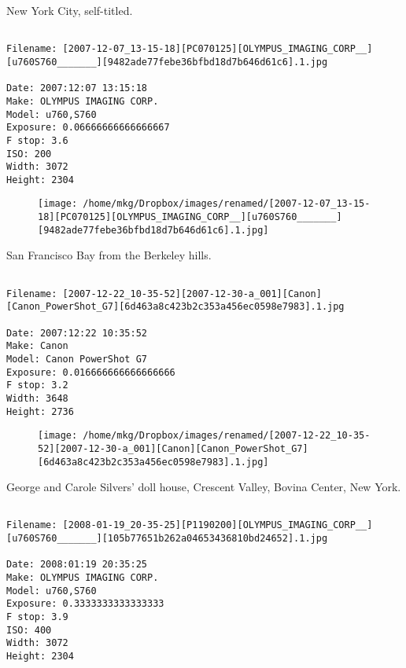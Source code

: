 \clearpage
\onecolumn
\noindent New York City, self-titled.
\noindent
\begin{lstlisting}

Filename: [2007-12-07_13-15-18][PC070125][OLYMPUS_IMAGING_CORP__][u760S760_______][9482ade77febe36bfbd18d7b646d61c6].1.jpg

Date: 2007:12:07 13:15:18
Make: OLYMPUS IMAGING CORP.  
Model: u760,S760       
Exposure: 0.06666666666666667
F stop: 3.6
ISO: 200
Width: 3072
Height: 2304
\end{lstlisting}
\clearpage

\begin{figure}
\texttt{[image: /home/mkg/Dropbox/images/renamed/[2007-12-07\_13-15-18][PC070125][OLYMPUS\_IMAGING\_CORP\_\_][u760S760\_\_\_\_\_\_\_][9482ade77febe36bfbd18d7b646d61c6].1.jpg]}
\end{figure}
    
\clearpage
\onecolumn
\noindent San Francisco Bay from the Berkeley hills.
\noindent
\begin{lstlisting}

Filename: [2007-12-22_10-35-52][2007-12-30-a_001][Canon][Canon_PowerShot_G7][6d463a8c423b2c353a456ec0598e7983].1.jpg

Date: 2007:12:22 10:35:52
Make: Canon
Model: Canon PowerShot G7
Exposure: 0.016666666666666666
F stop: 3.2
Width: 3648
Height: 2736
\end{lstlisting}
\clearpage

\begin{figure}
\texttt{[image: /home/mkg/Dropbox/images/renamed/[2007-12-22\_10-35-52][2007-12-30-a\_001][Canon][Canon\_PowerShot\_G7][6d463a8c423b2c353a456ec0598e7983].1.jpg]}
\end{figure}
    
\clearpage
\onecolumn
\noindent George and Carole Silvers' doll house, Crescent Valley, Bovina Center, New York.
\noindent
\begin{lstlisting}

Filename: [2008-01-19_20-35-25][P1190200][OLYMPUS_IMAGING_CORP__][u760S760_______][105b77651b262a04653436810bd24652].1.jpg

Date: 2008:01:19 20:35:25
Make: OLYMPUS IMAGING CORP.  
Model: u760,S760       
Exposure: 0.3333333333333333
F stop: 3.9
ISO: 400
Width: 3072
Height: 2304
\end{lstlisting}
\clearpage

